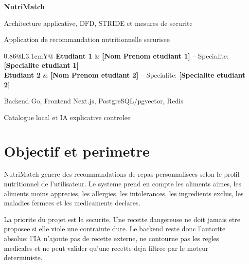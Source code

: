 \documentclass[10pt,a4paper]{article}
\begin{document}
\begin{titlepage}
  \centering
  \vspace*{1.7cm}
  {\Huge\bfseries NutriMatch\par}
  \vspace{0.45cm}
  {\Large Architecture applicative, DFD, STRIDE et mesures de securite\par}
  \vspace{0.8cm}
  {\large Application de recommandation nutritionnelle securisee\par}

  \vspace{1.6cm}
  \begin{tabularx}{0.86\textwidth}{@{}L{3.1cm}Y@{}}
    \toprule
    \textbf{Etudiant 1} & \textbf{[Nom Prenom etudiant 1]} -- Specialite: \textbf{[Specialite etudiant 1]} \\
    \textbf{Etudiant 2} & \textbf{[Nom Prenom etudiant 2]} -- Specialite: \textbf{[Specialite etudiant 2]} \\
    \bottomrule
  \end{tabularx}

  \vfill
  {\large Backend Go, Frontend Next.js, PostgreSQL/pgvector, Redis\par}
  \vspace{0.25cm}
  {\large Catalogue local et IA explicative controlee\par}
\end{titlepage}

\section{Objectif et perimetre}
NutriMatch genere des recommandations de repas personnalisees selon le profil nutritionnel de l'utilisateur. Le systeme prend en compte les aliments aimes, les aliments moins apprecies, les allergies, les intolerances, les ingredients exclus, les maladies fermees et les medicaments declares.

La priorite du projet est la securite. Une recette dangereuse ne doit jamais etre proposee si elle viole une contrainte dure. Le backend reste donc l'autorite absolue: l'IA n'ajoute pas de recette externe, ne contourne pas les regles medicales et ne peut valider qu'une recette deja filtree par le moteur deterministe.
\end{document}
